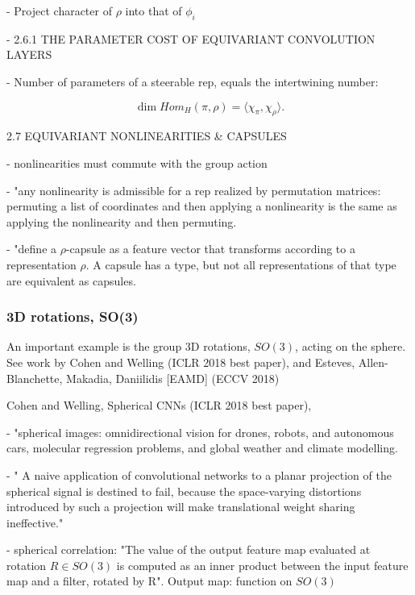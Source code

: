 \documentclass[english]{article}
\begin{document}
- Project character of $\rho$ into that of $\phi_i$

- 2.6.1 THE PARAMETER COST OF EQUIVARIANT CONVOLUTION LAYERS

- Number of parameters of a steerable rep, equals the intertwining number: 

$$\dim Hom_H (\pi,\rho) = \langle \chi_\pi ,\chi_\rho \rangle.$$ 

\item 2.7 EQUIVARIANT NONLINEARITIES \& CAPSULES

- nonlinearities must commute with the group action

- "any nonlinearity is admissible for a rep realized by permutation
matrices: permuting a list of coordinates and then applying a nonlinearity is the same as applying the nonlinearity and then permuting.


- "define a $\rho$-capsule as a feature vector that transforms
according to a representation $\rho$. A capsule has
a type, but not all representations of that type are equivalent as capsules. 



\eenum


\subsubsection{3D rotations, SO(3)}
\benum 

\item 
An important example is the group 3D rotations, $SO(3)$, acting on the sphere. See work by Cohen and Welling (ICLR 2018 best paper), and Esteves, Allen-Blanchette, Makadia, Daniilidis [EAMD] (ECCV 2018)

\item Cohen and Welling, Spherical CNNs (ICLR 2018 best paper),

\benum 

\item 
- "spherical images: omnidirectional vision for drones, robots, and autonomous cars, molecular regression problems, and global weather and climate modelling.

 - " A naive application of convolutional networks to a planar projection of the spherical
signal is destined to fail, because the space-varying distortions introduced by such
a projection will make translational weight sharing ineffective."

-  spherical correlation: "The value of the output feature map evaluated at rotation $R \in SO(3)$ is computed
as an inner product between the input feature map and a filter, rotated by R". Output map: function on $SO(3)$
\end{document}
